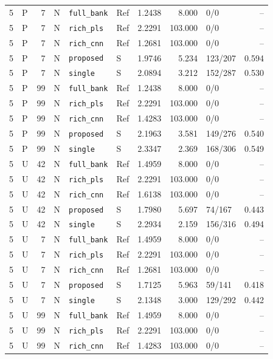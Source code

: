 \documentclass[10pt,a4paper]{article}
\begin{document}
\begin{landscape}
\begin{longtable}{rlrlllrrlr}
5 & P & 7 & N & \texttt{full\_bank} & Ref & 1.2438 & 8.000 & 0/0 & -- \\
5 & P & 7 & N & \texttt{rich\_pls} & Ref & 2.2291 & 103.000 & 0/0 & -- \\
5 & P & 7 & N & \texttt{rich\_cnn} & Ref & 1.2681 & 103.000 & 0/0 & -- \\
5 & P & 7 & N & \texttt{proposed} & S & 1.9746 & 5.234 & 123/207 & 0.594 \\
5 & P & 7 & N & \texttt{single} & S & 2.0894 & 3.212 & 152/287 & 0.530 \\
5 & P & 99 & N & \texttt{full\_bank} & Ref & 1.2438 & 8.000 & 0/0 & -- \\
5 & P & 99 & N & \texttt{rich\_pls} & Ref & 2.2291 & 103.000 & 0/0 & -- \\
5 & P & 99 & N & \texttt{rich\_cnn} & Ref & 1.4283 & 103.000 & 0/0 & -- \\
5 & P & 99 & N & \texttt{proposed} & S & 2.1963 & 3.581 & 149/276 & 0.540 \\
5 & P & 99 & N & \texttt{single} & S & 2.3347 & 2.369 & 168/306 & 0.549 \\
5 & U & 42 & N & \texttt{full\_bank} & Ref & 1.4959 & 8.000 & 0/0 & -- \\
5 & U & 42 & N & \texttt{rich\_pls} & Ref & 2.2291 & 103.000 & 0/0 & -- \\
5 & U & 42 & N & \texttt{rich\_cnn} & Ref & 1.6138 & 103.000 & 0/0 & -- \\
5 & U & 42 & N & \texttt{proposed} & S & 1.7980 & 5.697 & 74/167 & 0.443 \\
5 & U & 42 & N & \texttt{single} & S & 2.2934 & 2.159 & 156/316 & 0.494 \\
5 & U & 7 & N & \texttt{full\_bank} & Ref & 1.4959 & 8.000 & 0/0 & -- \\
5 & U & 7 & N & \texttt{rich\_pls} & Ref & 2.2291 & 103.000 & 0/0 & -- \\
5 & U & 7 & N & \texttt{rich\_cnn} & Ref & 1.2681 & 103.000 & 0/0 & -- \\
5 & U & 7 & N & \texttt{proposed} & S & 1.7125 & 5.963 & 59/141 & 0.418 \\
5 & U & 7 & N & \texttt{single} & S & 2.1348 & 3.000 & 129/292 & 0.442 \\
5 & U & 99 & N & \texttt{full\_bank} & Ref & 1.4959 & 8.000 & 0/0 & -- \\
5 & U & 99 & N & \texttt{rich\_pls} & Ref & 2.2291 & 103.000 & 0/0 & -- \\
5 & U & 99 & N & \texttt{rich\_cnn} & Ref & 1.4283 & 103.000 & 0/0 & -- \\

\end{longtable}
\end{landscape}
\end{document}
